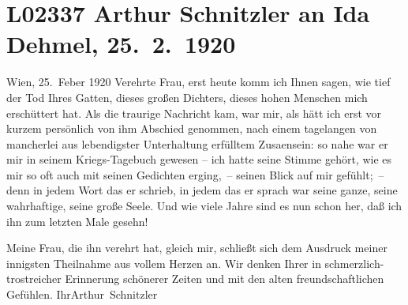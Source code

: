 

\section[Arthur Schnitzler an Ida Dehmel, 25. 2. 1920]{L02337 Arthur Schnitzler an Ida Dehmel, 25. 2. 1920}
\nopagebreak{}
\rehead{ }\normalsize\beginnumbering{}
\toendnotes[C]{\smallbreak\pagebreak[2]}
\toendnotes[C]{\smallbreak}
\pstart
           \raggedleft{}{\pb}Wien, 25. Feber 1920\pend
           \vspace{0.5em}
\pstart
           Verehrte Frau, erst heute komm ich Ihnen sagen, wie tief der Tod
               Ihres Gatten, dieses großen Dichters, dieses
               hohen Menschen mich erschüttert hat. Als die traurige Nachricht kam, war mir, als
               hätt ich erst vor kurzem persönlich von ihm Abschied genommen, nach einem tagelangen
               von mancherlei aus lebendigster Unterhaltung erfülltem Zusa{\geminationm}ensein: so nahe war er mir in seinem Kriegs-{\pb}Tagebuch
               gewesen – ich hatte seine Stimme gehört, wie es mir so oft auch mit seinen Gedichten
               erging, – seinen Blick auf mir gefühlt; – denn in jedem Wort das er schrieb, in jedem
               das er sprach war seine ganze, seine wahrhaftige, seine große Seele. Und wie viele
               Jahre sind es nun schon her, daß ich ihn zum letzten Male gesehn!\pend
           
\pstart
           Meine Frau, die ihn verehrt
               hat, gleich mir, schließt sich dem Ausdruck meiner innigsten Theilnahme aus vollem
               Herzen an. Wir denken Ihrer in schmerzlich-trostreicher Erinnerung schönerer Zeiten
               und mit den alten freundschaftlichen Gefühlen.\pend
           \pstart Ihr\spacefill\mbox{Arthur Schnitzler}\pend{}\endnumbering{}  
      
